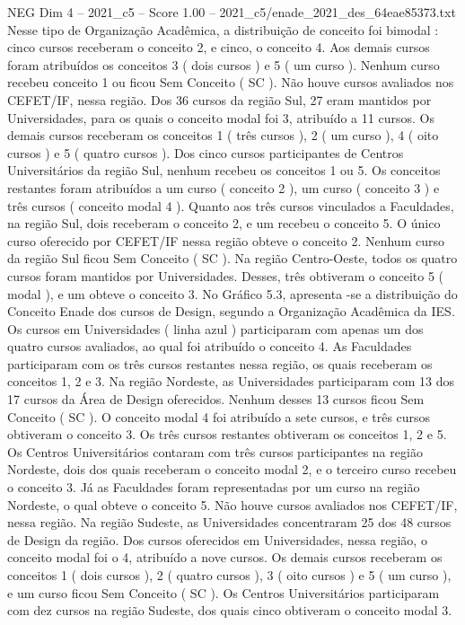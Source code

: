 \begin{textsample}{NEG Dim 4 – 2021\_c5 – Score 1.00 – 2021\_c5/enade\_2021\_des\_64eae85373.txt}
Nesse tipo de Organização Acadêmica, a distribuição de conceito foi bimodal : cinco cursos receberam o conceito 2, e cinco, o conceito 4.
Aos demais cursos foram atribuídos os conceitos 3 ( dois cursos ) e 5 ( um curso ).
Nenhum curso recebeu conceito 1 ou ficou Sem Conceito ( SC ).
Não houve cursos avaliados nos CEFET/IF, nessa região.
Dos 36 cursos da região Sul, 27 eram mantidos por Universidades, para os quais o conceito modal foi 3, atribuído a 11 cursos.
Os demais cursos receberam os conceitos 1 ( três cursos ), 2 ( um curso ), 4 ( oito cursos ) e 5 ( quatro cursos ).
Dos cinco cursos participantes de Centros Universitários da região Sul, nenhum recebeu os conceitos 1 ou 5.
Os conceitos restantes foram atribuídos a um curso ( conceito 2 ), um curso ( conceito 3 ) e três cursos ( conceito modal 4 ).
Quanto aos três cursos vinculados a Faculdades, na região Sul, dois receberam o conceito 2, e um recebeu o conceito 5.
O único curso oferecido por CEFET/IF nessa região obteve o conceito 2.
Nenhum curso da região Sul ficou Sem Conceito ( SC ).
Na região Centro-Oeste, todos os quatro cursos foram mantidos por Universidades.
Desses, três obtiveram o conceito 5 ( modal ), e um obteve o conceito 3.
No Gráfico 5.3, apresenta -se a distribuição do Conceito Enade dos cursos de Design, segundo a Organização Acadêmica da IES.
Os cursos em Universidades ( linha azul ) participaram com apenas um dos quatro cursos avaliados, ao qual foi atribuído o conceito 4.
As Faculdades participaram com os três cursos restantes nessa região, os quais receberam os conceitos 1, 2 e 3.
Na região Nordeste, as Universidades participaram com 13 dos 17 cursos da Área de Design oferecidos.
Nenhum desses 13 cursos ficou Sem Conceito ( SC ).
O conceito modal 4 foi atribuído a sete cursos, e três cursos obtiveram o conceito 3.
Os três cursos restantes obtiveram os conceitos 1, 2 e 5.
Os Centros Universitários contaram com três cursos participantes na região Nordeste, dois dos quais receberam o conceito modal 2, e o terceiro curso recebeu o conceito 3.
Já as Faculdades foram representadas por um curso na região Nordeste, o qual obteve o conceito 5.
Não houve cursos avaliados nos CEFET/IF, nessa região.
Na região Sudeste, as Universidades concentraram 25 dos 48 cursos de Design da região.
Dos cursos oferecidos em Universidades, nessa região, o conceito modal foi o 4, atribuído a nove cursos.
Os demais cursos receberam os conceitos 1 ( dois cursos ), 2 ( quatro cursos ), 3 ( oito cursos ) e 5 ( um curso ), e um curso ficou Sem Conceito ( SC ).
Os Centros Universitários participaram com dez cursos na região Sudeste, dos quais cinco obtiveram o conceito modal 3.

\end{textsample}
